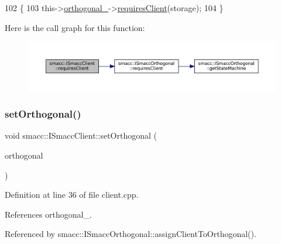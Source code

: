 \begin{DoxyCode}
102 \{
103     this->\hyperlink{classsmacc_1_1ISmaccClient_a571c7f672d9c90128b5498aefc27c136}{orthogonal\_}->\hyperlink{classsmacc_1_1ISmaccOrthogonal_a602e16b09f8a1b3de889f2f3d90a3211}{requiresClient}(storage);
104 \}
\end{DoxyCode}
Here is the call graph for this function\+:
\nopagebreak
\begin{figure}[H]
\begin{center}
\leavevmode
\includegraphics[width=350pt]{classsmacc_1_1ISmaccClient_a7a9990a2f3e35d547671188d69fee520_cgraph}
\end{center}
\end{figure}
\mbox{\label{classsmacc_1_1ISmaccClient_a40330788a976dc08e2f726d210564ec4}} 
\subsubsection{\texorpdfstring{set\+Orthogonal()}{setOrthogonal()}}
{\footnotesize\ttfamily void smacc\+::\+I\+Smacc\+Client\+::set\+Orthogonal (\begin{DoxyParamCaption}\item[{\hyperlink{classsmacc_1_1ISmaccOrthogonal}{I\+Smacc\+Orthogonal} $\ast$}]{orthogonal }\end{DoxyParamCaption})\hspace{0.3cm}{\ttfamily [protected]}}



Definition at line 36 of file client.\+cpp.



References orthogonal\+\_\+.



Referenced by smacc\+::\+I\+Smacc\+Orthogonal\+::assign\+Client\+To\+Orthogonal().


